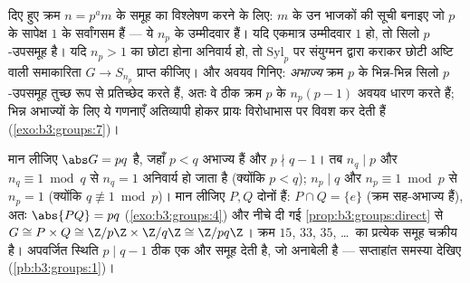 \begin{method}\label{met:b3:groups:sylowmethod}
दिए हुए क्रम $n = p^a m$ के समूह का विश्लेषण करने के लिए: $m$ के उन
भाजकों की सूची बनाइए जो $p$ के सापेक्ष $1$ के सर्वांगसम हैं
--- ये $n_p$ के उम्मीदवार हैं। यदि एकमात्र उम्मीदवार $1$ हो,
तो सिलो $p$-उपसमूह  है। यदि $n_p > 1$ का छोटा होना
अनिवार्य हो, तो $\mathrm{Syl}_p$ पर संयुग्मन द्वारा  कराकर छोटी अष्टि
वाली समाकारिता $G \to S_{n_p}$ प्राप्त कीजिए। और अवयव गिनिए: \emph{अभाज्य}
क्रम $p$ के भिन्न-भिन्न सिलो $p$-उपसमूह तुच्छ रूप से
प्रतिच्छेद करते हैं, अतः वे ठीक क्रम $p$ के $n_p(p-1)$ अवयव धारण
करते हैं; भिन्न अभाज्यों के लिए ये गणनाएँ अतिव्यापी होकर प्रायः
विरोधाभास पर विवश कर देती हैं (\cref{exo:b3:groups:7})।
\end{method}

\begin{example}\label{ex:b3:groups:pq}
मान लीजिए $\abs G = pq$ है, जहाँ $p < q$ अभाज्य हैं और $p \nmid q - 1$। तब $n_q \mid p$
और $n_q \equiv 1 \bmod q$ से $n_q = 1$ अनिवार्य हो जाता है (क्योंकि $p <
q$); $n_p \mid q$
और $n_p \equiv 1 \bmod p$ से $n_p = 1$ (क्योंकि $q
\not\equiv 1 \bmod p$)। मान लीजिए $P, Q$ दोनों
  हैं: $P
\cap Q = \{e\}$ (क्रम सह-अभाज्य हैं), अतः
$\abs{PQ} = pq$ (\cref{exo:b3:groups:4}) और नीचे दी गई \cref{prop:b3:groups:direct} से $G \cong P \times Q \cong \Z/p\Z
\times \Z/q\Z \cong \Z/pq\Z$। क्रम $15$, $33$,
$35$, \dots\ का प्रत्येक समूह चक्रीय है। अपवर्जित स्थिति $p \mid q - 1$
ठीक एक और समूह देती है, जो अनाबेली है --- सप्ताहांत समस्या
देखिए (\cref{pb:b3:groups:1})।
\end{example}

